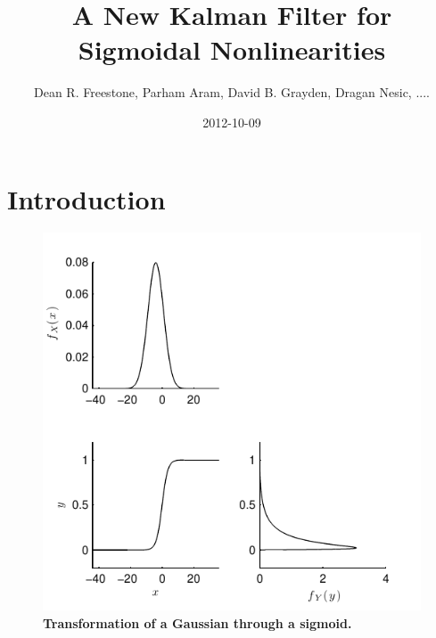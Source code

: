 \documentclass[]{article}
\title{A New Kalman Filter for Sigmoidal Nonlinearities}
\author{Dean R. Freestone, Parham Aram, David B. Grayden, Dragan Nesic, ....  }
\date{2012-10-09}
\begin{document}
\ifpdf
{}
\else
{}
\fi

\maketitle


\begin{abstract}
\end{abstract}

\section{Introduction}

\begin{figure}[!ht]
	\centering
		\includegraphics[scale=1]{./Figures/pdf/Mapping.pdf}
	\caption{\textbf{Transformation of a Gaussian through a sigmoid.}}
	\label{fig:label}
\end{figure}
\end{document}
